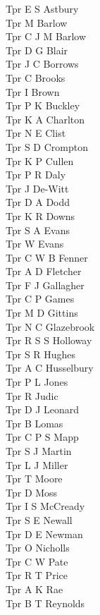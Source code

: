 \begin{multicols}{4}
  Tpr E S Astbury \\
  Tpr M Barlow \\
  Tpr C J M Barlow \\
  Tpr D G Blair \\
  Tpr J C Borrows \\
  Tpr C Brooks \\
  Tpr I Brown \\
  Tpr P K Buckley \\
  Tpr K A Charlton \\
  Tpr N E Clist \\
  Tpr S D Crompton \\
  Tpr K P Cullen \\
  Tpr P R Daly \\
  Tpr J De-Witt \\
  Tpr D A Dodd \\
  Tpr K R Downs \\
  Tpr S A Evans \\
  Tpr W Evans \\
  Tpr C W B Fenner \\
  Tpr A D Fletcher \\
  Tpr F J Gallagher \\
  Tpr C P Games \\
  Tpr M D Gittins \\
  Tpr N C Glazebrook \\
  Tpr R S S Holloway \\
  Tpr S R Hughes \\
  Tpr A C Husselbury \\
  Tpr P L Jones \\
  Tpr R Judic \\
  Tpr D J Leonard \\
  Tpr B Lomas \\
  Tpr C P S Mapp \\
  Tpr S J Martin \\
  Tpr L J Miller \\
  Tpr T Moore \\
  Tpr D Moss \\
  Tpr I S McCready \\
  Tpr S E Newall \\
  Tpr D E Newman \\
  Tpr O Nicholls \\
  Tpr C W Pate \\
  Tpr R T Price \\
  Tpr A K Rae \\
  Tpr B T Reynolds \\

\end{multicols}

